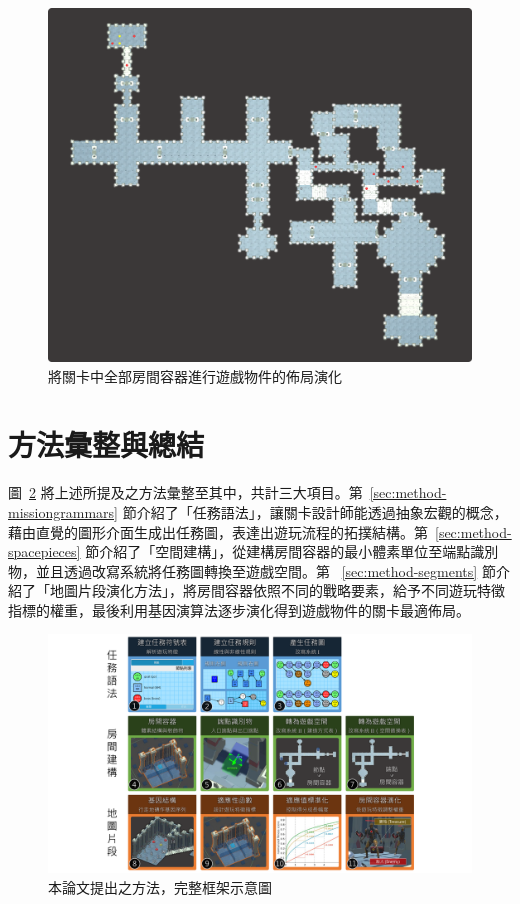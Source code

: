 \begin{figure}[!htb]
  \begin{center}
    \includegraphics[width=1.0\textwidth]{figures/applied-ga-on-volume-all.png}
    \caption{將關卡中全部房間容器進行遊戲物件的佈局演化} 
    \label{fig:applied-ga-on-volume-all}
  \end{center}
\end{figure}

\section{方法彙整與總結}
\label{sec:method-summary}

圖~\ref{fig:completed-framework} 將上述所提及之方法彙整至其中，共計三大項目。第~\ref{sec:method-missiongrammars} 節介紹了「任務語法」，讓關卡設計師能透過抽象宏觀的概念，藉由直覺的圖形介面生成出任務圖，表達出遊玩流程的拓撲結構。第~\ref{sec:method-spacepieces} 節介紹了「空間建構」，從建構房間容器的最小體素單位至端點識別物，並且透過改寫系統將任務圖轉換至遊戲空間。第 ~\ref{sec:method-segments} 節介紹了「地圖片段演化方法」，將房間容器依照不同的戰略要素，給予不同遊玩特徵指標的權重，最後利用基因演算法逐步演化得到遊戲物件的關卡最適佈局。

\begin{landscape}
  \begin{figure}[!htb]
    \begin{center}
      \includegraphics[width=1.0\linewidth]{figures/completed-framework.pdf}
      \caption{本論文提出之方法，完整框架示意圖} 
      \label{fig:completed-framework}
    \end{center}
  \end{figure}
\end{landscape}